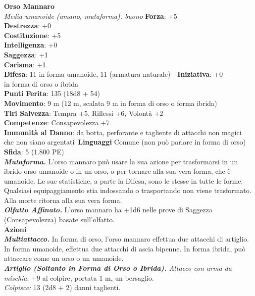 \begin{multicols}{2}
\medskip\textbf{Orso Mannaro}\\
\emph{Media umanoide (umano, mutaforma), buono}
\textbf{Forza}: +5\\
\textbf{Destrezza}: +0\\
\textbf{Costituzione}: +5\\
\textbf{Intelligenza}: +0\\
\textbf{Saggezza}: +1\\
\textbf{Carisma}: +1\\
\textbf{Difesa}: 11 in forma umanoide, 11 (armatura naturale) - \textbf{Iniziativa}: +0\\
in forma di orso o ibrida\\
\textbf{Punti Ferita}: 135 (18d8 + 54)\\
\textbf{Movimento}: 9 m (12 m, scalata 9 m in forma di orso o forma ibrida) \\
\textbf{Tiri Salvezza}:  Tempra +5, Riflessi +6, Volontà +2\\
\textbf{Competenze}: Consapevolezza +7\\
\textbf{Immunità al Danno}: da botta, perforante e tagliente di attacchi non magici che non siano argentati\
\textbf{Linguaggi} Comune (non può parlare in forma di orso)\\
\textbf{Sfida}: 5 (1.800 PE)\smallskip\\
\emph{\textbf{Mutaforma.}} L'orso mannaro può usare la sua azione per trasformarsi in un ibrido orso-umanoide o in un orso, o per tornare alla sua vera forma, che è umanoide. Le sue statistiche, a parte la Difesa, sono le stesse in tutte le forme. Qualsiasi equipaggiamento stia indossando o trasportando non viene trasformato. Alla morte ritorna alla sua vera forma.\\
\emph{\textbf{Olfatto Affinato.}} L'orso mannaro ha +1d6 nelle prove di Saggezza (Consapevolezza) basate sull'olfatto.\\
\smallskip\textbf{Azioni}\\
\emph{\textbf{Multiattacco.}} In forma di orso, l'orso mannaro effettua due attacchi di artiglio. In forma umanoide, effettua due attacchi di ascia bipenne. In forma ibrida, può attaccare come un orso o un umanoide.\\

\emph{\textbf{Artiglio (Soltanto in Forma di Orso o Ibrida).} Attacco con arma da mischia}: +9 al colpire, portata 1 m, un bersaglio.\\
\emph{Colpisce:} 13 (2d8 + 2) danni taglienti.\\


\end{multicols}
